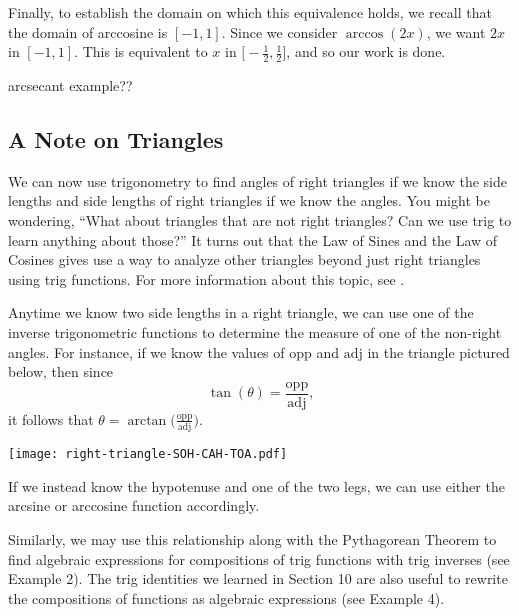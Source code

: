 \documentclass{ximera}
\begin{document}
\begin{example}
\begin{enumerate}
\begin{explanation}
Finally, to establish the domain on which this equivalence holds, we
recall that the domain of arccosine is $[-1,1]$. Since we consider $\arccos(2x)$, we want $2x$ in $[-1,1]$. This is equivalent to $x$ in $\Big[-\frac{1}{2}, \frac{1}{2} \Big]$, and so our work is done.

\item arcsecant example??
\end{explanation}
%
\end{enumerate}
\end{example}


\subsection{A Note on Triangles}
We can now use trigonometry to find angles of right triangles if we know the side lengths and side lengths of right triangles if we know the angles.  You might be wondering, ``What about triangles that are not right triangles? Can we use trig to learn anything about those?''  It turns out that the Law of Sines and the Law of Cosines gives use a way to analyze other triangles beyond just right triangles using trig functions.  For more information about this topic, see .


\begin{summary}
Anytime we know two side lengths in a right triangle, we can use one of the inverse trigonometric functions to determine the measure of one of the non-right angles.  For instance, if we know the values of $\text{opp}$ and $\text{adj}$ in the triangle pictured below, then since%
\begin{equation*}
\tan(\theta) = \frac{\text{opp}}{\text{adj}}\text{,}
\end{equation*}
it follows that $\theta = \arctan\!\bigg(\frac{\text{opp}}{\text{adj}}\bigg)$.%
%
\begin{image}
\texttt{[image: right-triangle-SOH-CAH-TOA.pdf]}
\end{image}
%
\par
%
If we instead know the hypotenuse and one of the two legs, we can use either the arcsine or arccosine function accordingly.%

Similarly, we may use this relationship along with the Pythagorean Theorem to find algebraic expressions for compositions of trig functions with trig inverses (see Example 2). The trig identities we learned in Section 10 are also useful to rewrite the compositions of functions as algebraic expressions (see Example 4). 
%

\end{summary}
\end{document}
